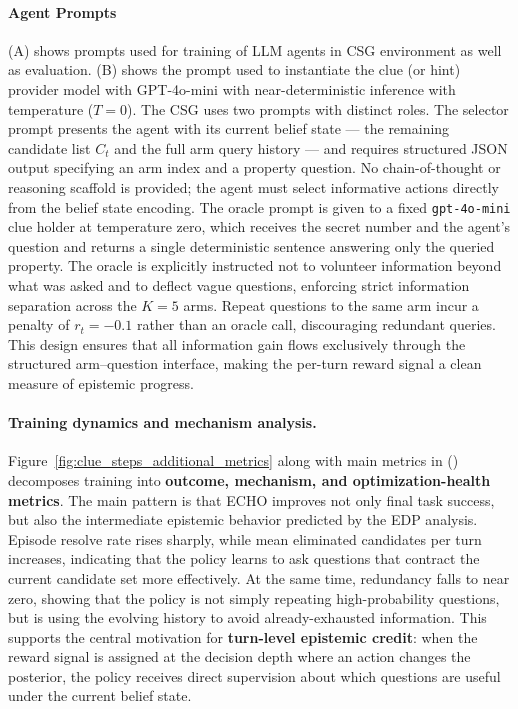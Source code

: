 \documentclass[11pt]{article}
\theoremstyle{plain}
\theoremstyle{definition}
\theoremstyle{remark}
\begin{document}
\paragraph{Agent Prompts}  (A) shows prompts used for training of LLM agents in CSG environment as well as evaluation.   (B) shows the prompt used to instantiate the clue (or hint) provider model with GPT-4o-mini with near-deterministic inference with temperature ($T=0$).  The CSG uses two prompts with distinct roles.
The selector prompt presents the agent with its current belief state ---
the remaining candidate list $C_t$ and the full arm query history ---
and requires structured JSON output specifying an arm index and a property question.
No chain-of-thought or reasoning scaffold is provided; the agent must select
informative actions directly from the belief state encoding.
The oracle prompt is given to a fixed \texttt{gpt-4o-mini} clue holder
at temperature zero, which receives the secret number and the agent's question
and returns a single deterministic sentence answering only the queried property.
The oracle is explicitly instructed not to volunteer information beyond what was asked
and to deflect vague questions, enforcing strict information separation across
the $K{=}5$ arms.
Repeat questions to the same arm incur a penalty of $r_t = -0.1$
rather than an oracle call, discouraging redundant queries.
This design ensures that all information gain flows exclusively through
the structured arm--question interface, making the per-turn reward signal
a clean measure of epistemic progress.



\paragraph{Training dynamics and mechanism analysis.}
Figure~\ref{fig:clue_steps_additional_metrics} along with main metrics in  () decomposes training into \textbf{outcome, mechanism, and optimization-health metrics}. The main pattern is that \textsc{ECHO} improves not only final task success, but also the intermediate epistemic behavior predicted by the EDP analysis. Episode resolve rate rises sharply, while mean eliminated candidates per turn increases, indicating that the policy learns to ask questions that contract the current candidate set more effectively. At the same time, redundancy falls to near zero, showing that the policy is not simply repeating high-probability questions, but is using the evolving history to avoid already-exhausted information. This supports the central motivation for \textbf{turn-level epistemic credit}: when the reward signal is assigned at the decision depth where an action changes the posterior, the policy receives direct supervision about which questions are useful under the current belief state.
\end{document}
